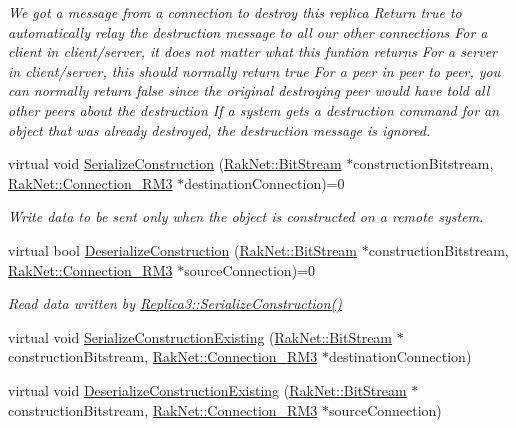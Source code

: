 \begin{DoxyCompactItemize}
\begin{DoxyCompactList}\small\item\em We got a message from a connection to destroy this replica Return true to automatically relay the destruction message to all our other connections For a client in client/server, it does not matter what this funtion returns For a server in client/server, this should normally return true For a peer in peer to peer, you can normally return false since the original destroying peer would have told all other peers about the destruction If a system gets a destruction command for an object that was already destroyed, the destruction message is ignored. \end{DoxyCompactList}\item 
virtual void \hyperlink{class_rak_net_1_1_replica3_a8297aa828aa9261d8ff6194f0023423a}{Serialize\-Construction} (\hyperlink{class_rak_net_1_1_bit_stream}{Rak\-Net\-::\-Bit\-Stream} $\ast$construction\-Bitstream, \hyperlink{class_rak_net_1_1_connection___r_m3}{Rak\-Net\-::\-Connection\-\_\-\-R\-M3} $\ast$destination\-Connection)=0
\begin{DoxyCompactList}\small\item\em Write data to be sent only when the object is constructed on a remote system. \end{DoxyCompactList}\item 
virtual bool \hyperlink{class_rak_net_1_1_replica3_a8e18c95612054b601ce0149f91a5a34d}{Deserialize\-Construction} (\hyperlink{class_rak_net_1_1_bit_stream}{Rak\-Net\-::\-Bit\-Stream} $\ast$construction\-Bitstream, \hyperlink{class_rak_net_1_1_connection___r_m3}{Rak\-Net\-::\-Connection\-\_\-\-R\-M3} $\ast$source\-Connection)=0
\begin{DoxyCompactList}\small\item\em Read data written by \hyperlink{class_rak_net_1_1_replica3_a8297aa828aa9261d8ff6194f0023423a}{Replica3\-::\-Serialize\-Construction()} \end{DoxyCompactList}\item 
virtual void \hyperlink{class_rak_net_1_1_replica3_a245a99bf6338ed42ab5386be11417fde}{Serialize\-Construction\-Existing} (\hyperlink{class_rak_net_1_1_bit_stream}{Rak\-Net\-::\-Bit\-Stream} $\ast$construction\-Bitstream, \hyperlink{class_rak_net_1_1_connection___r_m3}{Rak\-Net\-::\-Connection\-\_\-\-R\-M3} $\ast$destination\-Connection)
\item 
virtual void \hyperlink{class_rak_net_1_1_replica3_a1949dd5597c106d7538ed602133ec04d}{Deserialize\-Construction\-Existing} (\hyperlink{class_rak_net_1_1_bit_stream}{Rak\-Net\-::\-Bit\-Stream} $\ast$construction\-Bitstream, \hyperlink{class_rak_net_1_1_connection___r_m3}{Rak\-Net\-::\-Connection\-\_\-\-R\-M3} $\ast$source\-Connection)

\end{DoxyCompactItemize}
